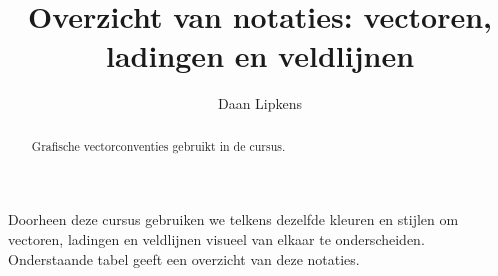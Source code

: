 \documentclass{ximera}
\title{Overzicht van notaties: vectoren, ladingen en veldlijnen}
\author{Daan Lipkens}
\begin{document}
\begin{abstract}
    Grafische vectorconventies gebruikt in de cursus.
\end{abstract}
\maketitle

Doorheen deze cursus gebruiken we telkens dezelfde kleuren en stijlen om vectoren, ladingen en veldlijnen visueel van elkaar te onderscheiden. Onderstaande tabel geeft een overzicht van deze notaties.

\newcommand{\vecsample}[1]{%
    \begin{tikzpicture}[baseline=-0.5ex]
        \draw[#1] (0,0) -- (1.2,0);
    \end{tikzpicture}%
}
\newcommand{\lijnsample}[1]{%
    \begin{tikzpicture}[baseline=-0.5ex]
        \draw[#1] (0,0) -- (1.2,0);
    \end{tikzpicture}%
}
\newcommand{\ladingsample}[2]{%
    \begin{tikzpicture}[baseline=-0.6ex]
        \node[#1] at (0,0) {$#2$};
    \end{tikzpicture}%
}
\end{document}
